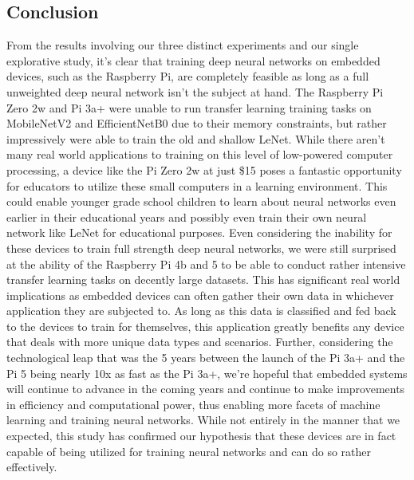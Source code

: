 \documentclass{article}
\begin{document}
\begin{multicols}{2}
\section{Conclusion}
From the results involving our three distinct experiments and our single explorative study, it’s clear that training deep neural networks on embedded devices, such as the Raspberry Pi, are completely feasible as long as a full unweighted deep neural network isn’t the subject at hand. The Raspberry Pi Zero 2w and Pi 3a+ were unable to run transfer learning training tasks on MobileNetV2 and EfficientNetB0 due to their memory constraints, but rather impressively were able to train the old and shallow LeNet. While there aren’t many real world applications to training on this level of low-powered computer processing, a device like the Pi Zero 2w at just \$15 poses a fantastic opportunity for educators to utilize these small computers in a learning environment. This could enable younger grade school children to learn about neural networks even earlier in their educational years and possibly even train their own neural network like LeNet for educational purposes. Even considering the inability for these devices to train full strength deep neural networks, we were still surprised at the ability of the Raspberry Pi 4b and 5 to be able to conduct rather intensive transfer learning tasks on decently large datasets. This has significant real world implications as embedded devices can often gather their own data in whichever application they are subjected to. As long as this data is classified and fed back to the devices to train for themselves, this application greatly benefits any device that deals with more unique data types and scenarios. Further, considering the technological leap that was the 5 years between the launch of the Pi 3a+ and the Pi 5 being nearly 10x as fast as the Pi 3a+, we’re hopeful that embedded systems will continue to advance in the coming years and continue to make improvements in efficiency and computational power, thus enabling more facets of machine learning and training neural networks. While not entirely in the manner that we expected, this study has confirmed our hypothesis that these devices are in fact capable of being utilized for training neural networks and can do so rather effectively.

\end{multicols}

 
 




\end{document}
